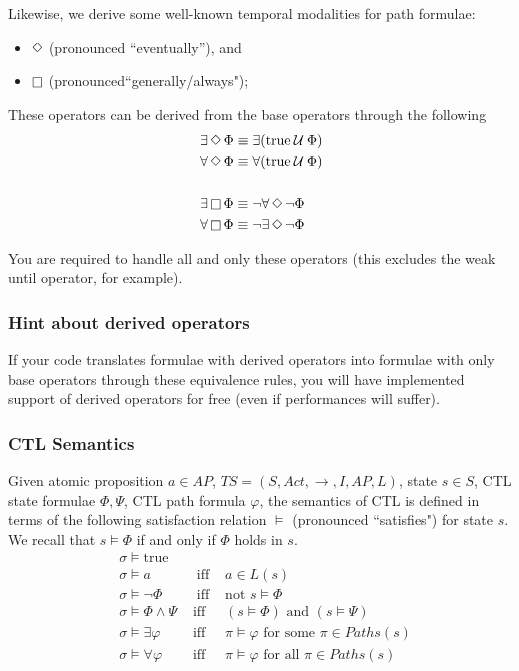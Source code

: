 \documentclass{article}
\begin{document}
Likewise, we derive some well-known temporal modalities for path formulae: 
\begin{itemize}
    \item $\mathop{\Diamond}$ (pronounced ``eventually''), and
    \item $\mathop{\square}$ (pronounced``generally/always");
\end{itemize}

These operators can be derived from the base operators through the following
\begin{align*}
    &\; \exists \mathop{\Diamond} \Phi \equiv \exists(\text{true} \mathbin{\mathcal{U}} \Phi) \\ 
    &\; \forall \mathop{\Diamond} \Phi \equiv \forall(\text{true} \mathbin{\mathcal{U}} \Phi) \\ 
    &\; \\ 
    &\; \exists \mathop{\square} \Phi \equiv \neg\forall \mathop{\Diamond} \neg\Phi \\ 
    &\; \forall \mathop{\square} \Phi \equiv \neg\exists \mathop{\Diamond} \neg\Phi \\
\end{align*}

You are required to handle all and only these operators (this excludes the weak until operator, for example).

\subsubsection*{Hint about derived operators}
If your code translates formulae with derived operators into formulae 
with only base operators through these equivalence rules, you will have implemented support of 
derived operators for free (even if performances will suffer).

\subsubsection*{CTL Semantics}
Given atomic proposition $a \in AP$, $TS = (S, Act, \rightarrow, I, AP, L)$, state $s \in S$, CTL state formulae $\Phi, \Psi$, CTL path formula $\varphi$, the semantics of CTL is defined in terms of the following satisfaction relation $\vDash$ (pronounced ``satisfies") for state $s$. We recall that $s \vDash \Phi$ if and only if $\Phi$ holds in $s$.
\begin{align*}
     & \sigma \vDash \text{true} & \\
     & \sigma \vDash a &\; \text{ iff } & a \in L(s) \\ 
     & \sigma \vDash \neg \Phi &\; \text{ iff } & \text{not } s \vDash \Phi \\
     & \sigma \vDash \Phi \land \Psi & \text{ iff }&  (s \vDash \Phi) \text{ and } (s \vDash \Psi) \\
     & \sigma \vDash \exists \varphi & \text{ iff } & \pi \vDash \varphi \text{ for some } \pi \in Paths(s) \\ 
     & \sigma \vDash \forall \varphi & \text{ iff }& \pi \vDash \varphi \text{ for all } \pi \in Paths(s) \\ 
\end{align*}
\end{document}
